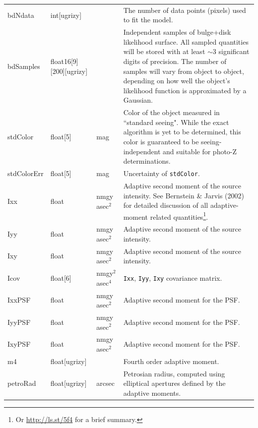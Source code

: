 \documentclass[12pt]{article}
\begin{document}
\begin{center}
\begin{longtable}{p{3cm}p{2cm}p{2cm}p{5cm}}
bdNdata & int[ugrizy] & ~ & The number of data points (pixels) used to fit the model. \\

bdSamples & float16[9][200][ugrizy] & ~ & Independent samples of bulge+disk likelihood surface. All sampled quantities will be stored with at least $\sim 3$ significant digits of precision. The number of samples will vary from object to object, depending on how well the object's likelihood function is approximated by a Gaussian.\\

stdColor & float[5] & mag & Color of the object measured in ``standard seeing". While the exact algorithm is yet to be determined, this color is guaranteed to be seeing-independent and suitable for photo-Z determinations.\\

stdColorErr & float[5] & mag & Uncertainty of {\tt stdColor}. \\

Ixx & float & nmgy asec$^{2}$ & Adaptive second moment of the source intensity. See Bernstein \& Jarvis (2002) for detailed discussion of all adaptive-moment related quantities\footnote{Or \url{http://ls.st/5f4} for a brief summary.}. \\

Iyy & float & nmgy asec$^{2}$ & Adaptive second moment of the source intensity. \\

Ixy & float & nmgy asec$^{2}$ & Adaptive second moment of the source intensity. \\

Icov & float[6] & nmgy$^{2}$ asec$^{4}$ & {\tt Ixx}, {\tt Iyy}, {\tt Ixy} covariance matrix. \\

IxxPSF & float & nmgy asec$^{2}$ & Adaptive second moment for the PSF. \\

IyyPSF & float & nmgy asec$^{2}$ & Adaptive second moment for the PSF. \\

IxyPSF & float & nmgy asec$^{2}$ & Adaptive second moment for the PSF. \\

m4 & float[ugrizy] & ~ & Fourth order adaptive moment. \\


petroRad & float[ugrizy] & arcsec & Petrosian radius, computed using elliptical apertures defined by the adaptive moments. \\


\end{longtable}
\end{center}
\end{document}
